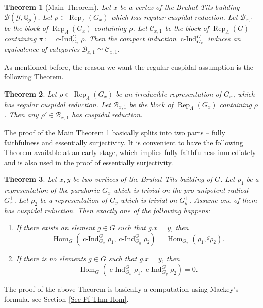 \documentclass{article}
\newtheorem{theorem}{Theorem}
\DeclareMathOperator{\cInd}{\operatorname{c-Ind}}
\newcommand{\Hom}{\operatorname{Hom}}
\newcommand{\Rep}{\operatorname{Rep}}
\begin{document}
	\begin{theorem}[Main Theorem]\label{Thm Main}
		Let $x$ be a vertex of the Bruhat-Tits building $\mathcal{B}(\mathcal{G}, \mathbb{Q}_p)$. Let $\rho \in \Rep_{\Lambda}(G_x)$ which has regular cuspidal reduction. Let $\mathcal{B}_{x,1}$ be the block of $\Rep_{\Lambda}(G_x)$ containing $\rho$. Let $\mathcal{C}_{x,1}$ be the block of $\Rep_{\Lambda}(G)$ containing $\pi:=\cInd_{G_x}^G\rho$. Then the compact induction $\cInd_{G_x}^G$ induces an equivalence of categories $\mathcal{B}_{x,1} \simeq \mathcal{C}_{x,1}$. 
	\end{theorem}
	
	As mentioned before, the reason we want the regular cuspidal assumption is the following Theorem. 
	
	\begin{theorem}\label{Thm Cusp Red}
		Let $\rho \in \Rep_{\Lambda}(G_x)$ be an irreducible representation of $G_x$, which has regular cuspidal reduction. Let $\mathcal{B}_{x,1}$ be the block of $\Rep_{\Lambda}(G_x)$ containing $\rho$. Then any $\rho' \in \mathcal{B}_{x,1}$ has cuspidal reduction.
	\end{theorem}
	
	The proof of the Main Theorem \ref{Thm Main} basically splits into two parts -- fully faithfulness and essentially surjectivity. It is convenient to have the following Theorem available at an early stage, which implies fully faithfulness immediately and is also used in the proof of essentially surjectivity.
	
	\begin{theorem}\label{Thm Hom}
		Let $x, y$ be two vertices of the Bruhat-Tits building of $G$. Let $\rho_1$ be a representation of the parahoric $G_x$ which is trivial on the pro-unipotent radical $G_x^+$. Let $\rho_2$ be a representation of $G_y$ which is trivial on $G_y^+$. Assume one of them has cuspidal reduction. Then exactly one of the following happens:
		\begin{enumerate}
			\item If there exists an element $g \in G$ such that $g.x=y$, then
			$$\Hom_G(\cInd_{G_x}^G\rho_1, \cInd_{G_y}^G\rho_2)=\Hom_{G_x}(\rho_1, {^g\rho_2}).$$
			\item If there is no elements $g \in G$ such that $g.x=y$, then
			$$\Hom_G(\cInd_{G_x}^G\rho_1, \cInd_{G_y}^G\rho_2)=0.$$
		\end{enumerate}
	\end{theorem}
	
	The proof of the above Theorem is basically a computation using Mackey's formula. see Section \ref{Sec Pf Thm Hom}.
	
\end{document}

